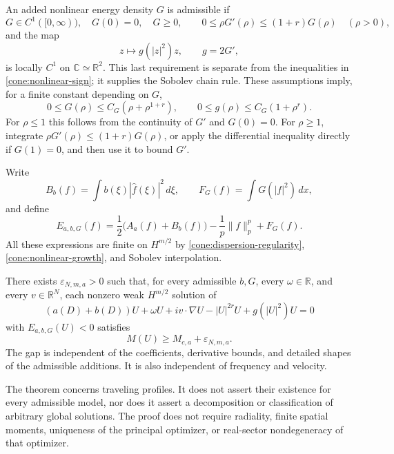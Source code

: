 An added nonlinear energy density \(G\) is admissible if
\begin{equation}\label{cone:nonlinear-sign}
G\in C^1([0,\infty)),\quad G(0)=0,\quad G\ge0,\qquad
0\le\rho G'(\rho)\le(1+r)G(\rho)\quad(\rho>0),
\end{equation}
and the map
\begin{equation}\label{cone:nonlinear-regularity}
z\longmapsto g(|z|^2)z,\qquad g=2G',
\end{equation}
is locally \(C^1\) on \(\mathbb C\simeq\mathbb R^2\).
This last requirement is separate from the inequalities in
\eqref{cone:nonlinear-sign}; it supplies the Sobolev chain rule.
These assumptions imply, for a finite constant depending on \(G\),
\begin{equation}\label{cone:nonlinear-growth}
0\le G(\rho)\le C_G(\rho+\rho^{1+r}),\qquad
0\le g(\rho)\le C_G(1+\rho^r).
\end{equation}
For \(\rho\le1\) this follows from the continuity of \(G'\) and
\(G(0)=0\). For \(\rho\ge1\), integrate
\(\rho G'(\rho)\le(1+r)G(\rho)\), or apply the differential inequality
directly if \(G(1)=0\), and then use it to bound \(G'\).

Write
\[
B_b(f)=\int b(\xi)|\widehat f(\xi)|^2\,d\xi,\qquad
F_G(f)=\int G(|f|^2)\,dx,
\]
and define
\begin{equation}\label{cone:energy}
E_{a,b,G}(f)=\frac12\bigl(A_a(f)+B_b(f)\bigr)
-\frac1p\|f\|_p^p+F_G(f).
\end{equation}
All these expressions are finite on \(H^{m/2}\) by
\eqref{cone:dispersion-regularity},
\eqref{cone:nonlinear-growth}, and Sobolev interpolation.

\begin{theorem}
\label{cone:gap}
There exists \(\varepsilon_{N,m,a}>0\) such that, for every admissible
\(b,G\), every \(\omega\in\mathbb R\), and every \(v\in\mathbb R^N\),
each nonzero weak \(H^{m/2}\) solution of
\begin{equation}\label{cone:profile}
(a(D)+b(D))U+\omega U+iv\cdot\nabla U
-|U|^{2r}U+g(|U|^2)U=0
\end{equation}
with \(E_{a,b,G}(U)<0\) satisfies
\[
M(U)\ge M_{c,a}+\varepsilon_{N,m,a}.
\]
The gap is independent of the coefficients, derivative bounds,
and detailed shapes of the admissible additions. It is also
independent of frequency and velocity.
\end{theorem}

The theorem concerns traveling profiles. It does not assert their
existence for every admissible model, nor does it assert a
decomposition or classification of arbitrary global solutions.
The proof does not require radiality, finite spatial moments,
uniqueness of the principal optimizer, or real-sector
nondegeneracy of that optimizer.

